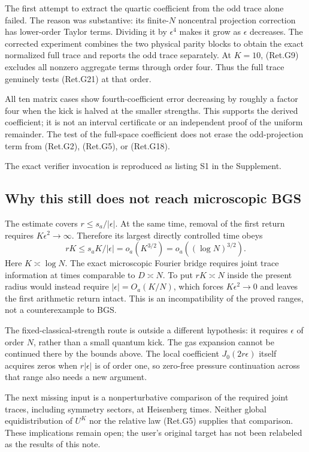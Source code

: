 The first attempt to extract the quartic coefficient from the odd trace
alone failed. The reason was substantive: its finite-\(N\) noncentral
projection correction has lower-order Taylor terms. Dividing it by
\(\epsilon^4\) makes it grow as \(\epsilon\) decreases.
The corrected experiment combines the two physical parity blocks to obtain
the exact normalized full trace and reports the odd trace separately.
At \(K=10\), (Ret.G9) excludes all nonzero aggregate terms through order four.
Thus the full trace genuinely tests (Ret.G21) at that order.

All ten matrix cases show fourth-coefficient error decreasing by roughly
a factor four when the kick is halved at the smaller strengths.
This supports the derived coefficient; it is not an interval certificate
or an independent proof of the uniform remainder.
The test of the full-space coefficient does not erase the odd-projection
term from (Ret.G2), (Ret.G5), or (Ret.G18).

The exact verifier invocation is reproduced as listing S1 in the Supplement.

\hypertarget{why-this-still-does-not-reach-microscopic-bgs}{%
\subsection{Why this still does not reach microscopic BGS}\label{why-this-still-does-not-reach-microscopic-bgs}}

The estimate covers \(r\le s_a/|\epsilon|\).
At the same time, removal of the first return requires
\(K\epsilon^2\to\infty\).
Therefore its largest directly controlled time obeys
\[
 rK\le s_a K/|\epsilon|=o_a(K^{3/2})
                                  =o_a((\log N)^{3/2}).    \tag{Ret.G23}
\]
Here \(K\asymp\log N\). The exact microscopic Fourier bridge requires
joint trace information at times comparable to \(D\asymp N\).
To put \(rK\asymp N\) inside the present radius would instead require
\(|\epsilon|=O_a(K/N)\), which forces \(K\epsilon^2\to0\) and leaves
the first arithmetic return intact. This is an incompatibility of the
proved ranges, not a counterexample to BGS.

The fixed-classical-strength route is outside a different hypothesis:
it requires \(\epsilon\) of order \(N\), rather than a small quantum kick.
The gas expansion cannot be continued there by the bounds above.
The local coefficient \(J_0(2r\epsilon)\) itself acquires zeros when
\(r|\epsilon|\) is of order one, so zero-free pressure continuation across
that range also needs a new argument.

The next missing input is a nonperturbative comparison of the required
joint traces, including symmetry sectors, at Heisenberg times.
Neither global equidistribution of \(U^K\) nor the relative law (Ret.G5)
supplies that comparison. These implications remain open; the user's
original target has not been relabeled as the results of this note.
